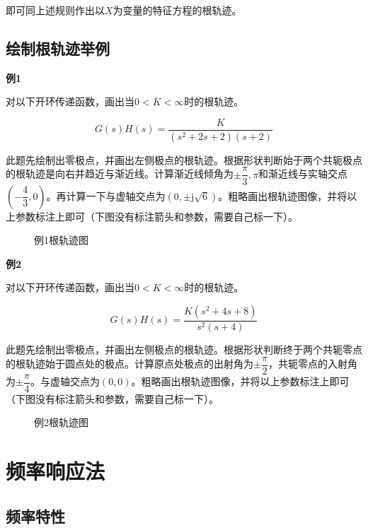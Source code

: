 \documentclass[cn, blue, normal, 12pt]{elegantnote}
\begin{document}
即可同上述规则作出以$X$为变量的特征方程的根轨迹。

\subsection{绘制根轨迹举例}

\textbf{例1}

对以下开环传递函数，画出当$0<K<\infty$时的根轨迹。

\begin{equation}
    G(s)H(s)=\frac{K}{(s^2+2s+2)(s+2)}
\end{equation}

此题先绘制出零极点，并画出左侧极点的根轨迹。根据形状判断始于两个共轭极点的根轨迹是向右并趋近与渐近线。计算渐近线倾角为$\pm\dfrac{\pi}{3},\pi$和渐近线与实轴交点$\left(-\dfrac{4}{3},0\right)$。再计算一下与虚轴交点为$\left(0,\pm\mathrm{j}\sqrt{6}\right)$。粗略画出根轨迹图像，并将以上参数标注上即可（下图没有标注箭头和参数，需要自己标一下）。

\begin{figure}[htbp]
    \centering
    
    \caption{例1根轨迹图}
\end{figure}

\textbf{例2}

对以下开环传递函数，画出当$0<K<\infty$时的根轨迹。

\begin{equation}
    G(s)H(s)=\frac{K(s^2+4s+8)}{s^2(s+4)}
\end{equation}

此题先绘制出零极点，并画出左侧极点的根轨迹。根据形状判断终于两个共轭零点的根轨迹始于圆点处的极点。计算原点处极点的出射角为$\pm\dfrac{\pi}{2}$，共轭零点的入射角为$\pm\dfrac{\pi}{4}$。与虚轴交点为$(0,0)$。粗略画出根轨迹图像，并将以上参数标注上即可（下图没有标注箭头和参数，需要自己标一下）。

\begin{figure}[htbp]
    \centering
    
    \caption{例2根轨迹图}
\end{figure}

\section{频率响应法}

\subsection{频率特性}
\end{document}
